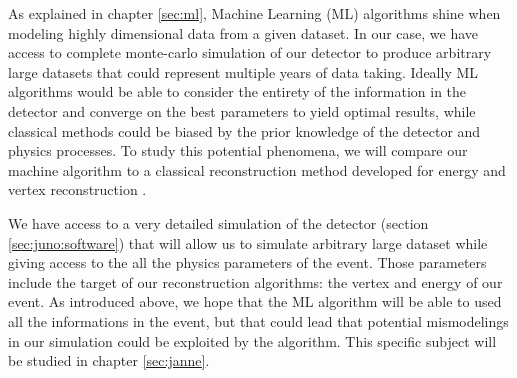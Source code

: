 \documentclass[../main.tex]{subfiles}
\begin{document}

As explained in chapter \ref{sec:ml}, Machine Learning (ML) algorithms shine when modeling highly dimensional data from a given dataset. In our case, we have access to complete monte-carlo simulation of our detector to produce arbitrary large datasets that could represent multiple years of data taking.
Ideally ML algorithms would be able to consider the entirety of the information in the detector and converge on the best parameters to yield optimal results, while classical methods could be biased by the prior knowledge of the detector and physics processes. To study this potential phenomena, we will compare our machine algorithm to a classical reconstruction method developed for energy and vertex reconstruction \cite{lebrin_towards_2022}.

We have access to a very detailed simulation of the detector (section \ref{sec:juno:software}) that will allow us to simulate arbitrary large dataset while giving access to the all the physics parameters of the event. Those parameters include the target of our reconstruction algorithms: the vertex and energy of our event. As introduced above, we hope that the ML algorithm will be able to used all the informations in the event, but that could lead that potential mismodelings in our simulation could be exploited by the algorithm. This specific subject will be studied in chapter \ref{sec:janne}.
\end{document}
